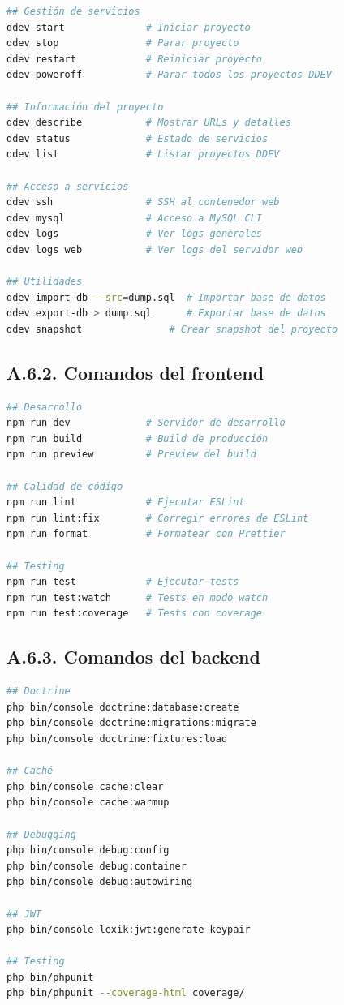 \documentclass[12pt,a4paper,oneside]{report}
\begin{document}
\begin{lstlisting}[language=bash]
## Gestión de servicios
ddev start              # Iniciar proyecto
ddev stop               # Parar proyecto
ddev restart            # Reiniciar proyecto
ddev poweroff           # Parar todos los proyectos DDEV

## Información del proyecto
ddev describe           # Mostrar URLs y detalles
ddev status             # Estado de servicios
ddev list               # Listar proyectos DDEV

## Acceso a servicios
ddev ssh                # SSH al contenedor web
ddev mysql              # Acceso a MySQL CLI
ddev logs               # Ver logs generales
ddev logs web           # Ver logs del servidor web

## Utilidades
ddev import-db --src=dump.sql  # Importar base de datos
ddev export-db > dump.sql      # Exportar base de datos
ddev snapshot               # Crear snapshot del proyecto
\end{lstlisting}

\subsection{A.6.2. Comandos del
frontend}\label{a.6.2.-comandos-del-frontend}

\begin{lstlisting}[language=bash]
## Desarrollo
npm run dev             # Servidor de desarrollo
npm run build           # Build de producción
npm run preview         # Preview del build

## Calidad de código
npm run lint            # Ejecutar ESLint
npm run lint:fix        # Corregir errores de ESLint
npm run format          # Formatear con Prettier

## Testing
npm run test            # Ejecutar tests
npm run test:watch      # Tests en modo watch
npm run test:coverage   # Tests con coverage
\end{lstlisting}

\subsection{A.6.3. Comandos del
backend}\label{a.6.3.-comandos-del-backend}

\begin{lstlisting}[language=bash]
## Doctrine
php bin/console doctrine:database:create
php bin/console doctrine:migrations:migrate
php bin/console doctrine:fixtures:load

## Caché
php bin/console cache:clear
php bin/console cache:warmup

## Debugging
php bin/console debug:config
php bin/console debug:container
php bin/console debug:autowiring

## JWT
php bin/console lexik:jwt:generate-keypair

## Testing
php bin/phpunit
php bin/phpunit --coverage-html coverage/
\end{lstlisting}
\end{document}
